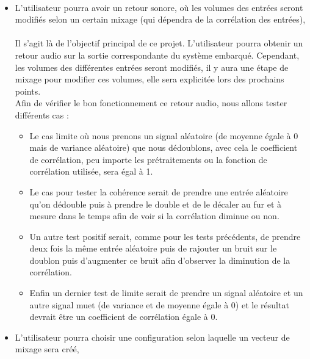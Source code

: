 \documentclass{article}
\begin{document}
\paragraph{}
\begin{itemize}
 \item L'utilisateur pourra avoir un retour sonore, où les volumes des
       entrées seront modifiés selon un certain mixage (qui dépendra de la
       corrélation des entrées),
       \paragraph{}
       Il s'agit là de l'objectif principal de ce projet. L'utilisateur pourra
       obtenir un retour audio sur la sortie correspondante du système embarqué.
       Cependant, les volumes des différentes entrées seront modifiés, il y
       aura une étape de mixage pour modifier ces volumes, elle sera explicitée
       lors des prochains points.
       \\
       Afin de vérifier le bon fonctionnement ce retour audio, nous allons tester
       différents cas :
       \begin{itemize}
        \item Le cas limite où nous prenons un signal aléatoire (de moyenne égale à 0 mais de variance aléatoire)
              que nous dédoublons, avec
              cela le coefficient de corrélation, peu importe les prétraitements ou la fonction de
              corrélation utilisée, sera égal à 1.
        \item Le cas pour tester la cohérence serait de prendre une entrée aléatoire
              qu'on dédouble puis à prendre le double et de le décaler au fur et à mesure dans le temps
              afin de voir si la corrélation diminue ou non.
        \item Un autre test positif serait, comme pour les tests précédents, de prendre deux fois la même
              entrée aléatoire puis de rajouter un bruit sur le doublon puis d'augmenter
              ce bruit afin d'observer la diminution de la corrélation.
        \item Enfin un dernier test de limite serait de prendre un signal aléatoire
              et un autre signal muet (de variance et de moyenne égale à 0) et le résultat
              devrait être un coefficient de corrélation égale à 0.
       \end{itemize}
       
       
 \item L'utilisateur pourra choisir une configuration selon laquelle un
       vecteur de mixage sera créé,

\end{itemize}
\end{document}
